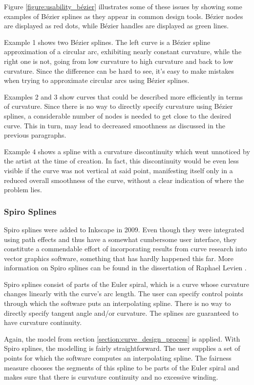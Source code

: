 \documentclass[a4paper]{article}
\begin{document}
				Figure \ref{figure:usability_bézier} illustrates some of these issues by showing some examples of Bézier splines as they appear in common design tools. Bézier nodes are displayed as red dots, while Bézier handles are displayed as green lines.

				Example 1 shows two Bézier splines. The left curve is a Bézier spline approximation of a circular arc, exhibiting nearly constant curvature, while the right one is not, going from low curvature to high curvature and back to low curvature. Since the difference can be hard to see, it's easy to make mistakes when trying to approximate circular arcs using Bézier splines.

				Examples 2 and 3 show curves that could be described more efficiently in terms of curvature. Since there is no way to directly specify curvature using Bézier splines, a considerable number of nodes is needed to get close to the desired curve. This in turn, may lead to decreased smoothness as discussed in the previous paragraphs.

				Example 4 shows a spline with a curvature discontinuity which went unnoticed by the artist at the time of creation. In fact, this discontinuity would be even less visible if the curve was not vertical at said point, manifesting itself only in a reduced overall smoothness of the curve, without a clear indication of where the problem lies.

			\subsubsection{Spiro Splines}
			\label{section:spiro_splines}

				Spiro splines were added to Inkscape in 2009. Even though they were integrated using path effects and thus have a somewhat cumbersome user interface, they constitute a commendable effort of incorporating results from curve research into vector graphics software, something that has hardly happened this far. More information on Spiro splines can be found in the dissertation of Raphael Levien \cite{thesis-spiro}.

				Spiro splines consist of parts of the Euler spiral, which is a curve whose curvature changes linearly with the curve's arc length. The user can specify control points through which the software puts an interpolating spline. There is no way to directly specify tangent angle and/or curvature. The splines are guaranteed to have curvature continuity.

				Again, the model from section \ref{section:curve_design_process} is applied. With Spiro splines, the modelling is fairly straightforward. The user supplies a set of points for which the software computes an interpolating spline. The fairness measure chooses the segments of this spline to be parts of the Euler spiral and makes sure that there is curvature continuity and no excessive winding.
\end{document}
